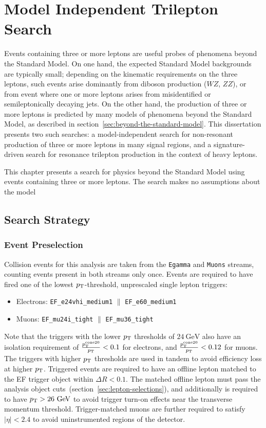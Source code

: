 \chapter{Model Independent Trilepton Search}\label{ch:model-independent-trilepton-search}

Events containing three or more leptons are useful probes of phenomena beyond the Standard Model. On one hand, the expected Standard Model backgrounds are typically small; depending on the kinematic requirements on the three leptons, such events arise dominantly from diboson production ($WZ$, $ZZ$), or from event where one or more leptons arises from misidentified or semileptonically decaying jets. On the other hand, the production of three or more leptons is predicted by many models of phenomena beyond the Standard Model, as described in section~\ref{sec:beyond-the-standard-model}. This dissertation presents two such searches: a model-independent search for non-resonant production of three or more leptons in many signal regions, and a signature-driven search for resonance trilepton production in the context of heavy leptons. 

This chapter presents a search for physics beyond the Standard Model using events containing three or more leptons. The search makes no assumptions about the model 

\section{Search Strategy}
\subsection{Event Preselection}\label{sec:event-preselection}
Collision events for this analysis are taken from the \verb.Egamma. and \verb.Muons. streams, counting events present in both streams only once. Events are required to have fired one of the lowest $p_{\text{T}}$-threshold, unprescaled single lepton triggers:

\begin{itemize}
	\item Electrons: \verb.EF_e24vhi_medium1. $\parallel$ \verb.EF_e60_medium1.
	\item Muons: \verb.EF_mu24i_tight. $\parallel$ \verb.EF_mu36_tight.
\end{itemize}

Note that the triggers with the lower $p_{\text{T}}$ thresholds of $24~\mbox{GeV}$ also have an isolation requirement of $\frac{p_{\text{T}}^{\mathrm{cone}20}}{p_{\text{T}}}<0.1$ for electrons, and $\frac{p_{\text{T}}^{\mathrm{cone}20}}{p_{\text{T}}}<0.12$ for muons. The triggers with higher $p_{\text{T}}$ thresholds are used in tandem to avoid efficiency loss at higher $p_{\text{T}}$. 
Triggered events are required to have an offline lepton matched to the EF trigger object within $\Delta R<0.1$. The matched offline lepton must pass the analysis object cuts~(section~\ref{sec:lepton-selections}), and additionally is required to have $p_{\text{T}}>26~\mbox{GeV}$ to avoid trigger turn-on effects near the transverse momentum threshold. Trigger-matched muons are further required to satisfy $|\eta|<2.4$ to avoid uninstrumented regions of the detector.

